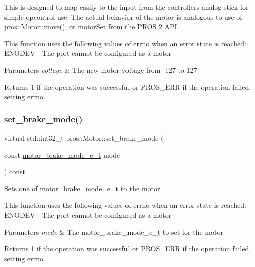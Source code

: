 This is designed to map easily to the input from the controller\textquotesingle{}s analog stick for simple opcontrol use. The actual behavior of the motor is analogous to use of \hyperlink{classpros_1_1Motor_a7ea9aedd4e12844be2584dc3f4b7a4bf}{pros\+::\+Motor\+::move()}, or motor\+Set from the P\+R\+OS 2 A\+PI.

This function uses the following values of errno when an error state is reached\+: E\+N\+O\+D\+EV -\/ The port cannot be configured as a motor


\begin{DoxyParams}{Parameters}
{\em voltage} & The new motor voltage from -\/127 to 127\\
\hline
\end{DoxyParams}
\begin{DoxyReturn}{Returns}
1 if the operation was successful or P\+R\+O\+S\+\_\+\+E\+RR if the operation failed, setting errno. 
\end{DoxyReturn}
\mbox{\label{classpros_1_1Motor_ab51969169dc534537f79710261daa3dd}} 
\subsubsection{\texorpdfstring{set\+\_\+brake\+\_\+mode()}{set\_brake\_mode()}}
{\footnotesize\ttfamily virtual std\+::int32\+\_\+t pros\+::\+Motor\+::set\+\_\+brake\+\_\+mode (\begin{DoxyParamCaption}\item[{const \hyperlink{motors_8h_aa324a2881696428c9e3684f9ad23a83b}{motor\+\_\+brake\+\_\+mode\+\_\+e\+\_\+t}}]{mode }\end{DoxyParamCaption}) const\hspace{0.3cm}{\ttfamily [virtual]}}



Sets one of motor\+\_\+brake\+\_\+mode\+\_\+e\+\_\+t to the motor. 

This function uses the following values of errno when an error state is reached\+: E\+N\+O\+D\+EV -\/ The port cannot be configured as a motor


\begin{DoxyParams}{Parameters}
{\em mode} & The motor\+\_\+brake\+\_\+mode\+\_\+e\+\_\+t to set for the motor\\
\hline
\end{DoxyParams}
\begin{DoxyReturn}{Returns}
1 if the operation was successful or P\+R\+O\+S\+\_\+\+E\+RR if the operation failed, setting errno. 
\end{DoxyReturn}
\mbox{\label{classpros_1_1Motor_a4c496dfb0b33f989d7329a61b7b6d6ba}} 
